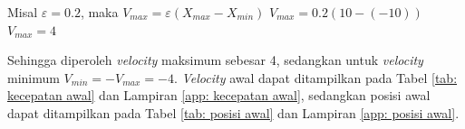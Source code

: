 {{\begin{enumerate}[align = left, left = 0cm, nolistsep]
\begin{enumerate}[label = (\alph*), align = left, left = 0cm, nolistsep]
                        Misal $\varepsilon = 0.2$, maka  \newline
                        $V_{max} = \varepsilon(X_{max}-X_{min})$ \newline
                        $V_{max} = 0.2(10-(-10))$ \newline
                        $V_{max} = 4$

                        Sehingga diperoleh \textit{velocity} maksimum sebesar 4, sedangkan untuk \textit{velocity} minimum $V_{min} = -V_{max} = -4$.
                        \textit{Velocity} awal dapat ditampilkan pada Tabel \ref{tab: kecepatan awal} dan Lampiran \ref{app: kecepatan awal},
                        sedangkan posisi awal dapat ditampilkan pada Tabel \ref{tab: posisi awal} dan Lampiran \ref{app: posisi awal}.


\end{enumerate}
\end{enumerate}}}
